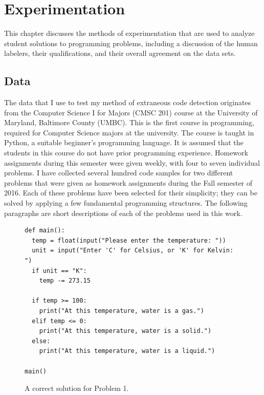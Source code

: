 \renewcommand{\thechapter}{5}
\chapter{Experimentation}
This chapter discusses the methods of experimentation that are used to analyze student solutions to programming problems, including a discussion of the human labelers, their qualifications, and their overall agreement on the data sets.

\section{Data}
The data that I use to test my method of extraneous code detection originates from the Computer Science I for Majors (CMSC 201) course at the University of Maryland, Baltimore County (UMBC). This is the first course in programming, required for Computer Science majors at the university. The course is taught in Python, a suitable beginner's programming language. It is assumed that the students in this course do not have prior programming experience. Homework assignments during this semester were given weekly, with four to seven individual problems. I have collected several hundred code samples for two different problems that were given as homework assignments during the Fall semester of 2016. Each of these problems have been selected for their simplicity; they can be solved by applying a few fundamental programming structures. The following paragraphs are short descriptions of each of the problems used in this work.

\begin{figure}
\begin{lstlisting}[numbers=none]
def main():
  temp = float(input("Please enter the temperature: "))
  unit = input("Enter 'C' for Celsius, or 'K' for Kelvin: ")
  if unit == "K":
    temp -= 273.15

  if temp >= 100:
    print("At this temperature, water is a gas.")
  elif temp <= 0:
    print("At this temperature, water is a solid.")
  else:
    print("At this temperature, water is a liquid.")

main()
\end{lstlisting}
\caption{A correct solution for Problem 1.}
\label{fig:correctp1}
\end{figure}
